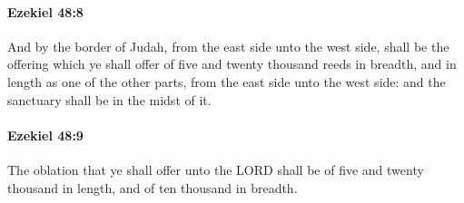 		\paragraph{Ezekiel 48:8} %
			\label{EZEKIEL-48-8}

			And by the border of Judah, from the east side unto the west side, shall be the offering which ye shall offer of five and twenty thousand reeds in breadth, and in length as one of the other parts, from the east side unto the west side: and the sanctuary shall be in the midst of it.


		\paragraph{Ezekiel 48:9} %
			\label{EZEKIEL-48-9}

			The oblation that ye shall offer unto the LORD shall be of five and twenty thousand in length, and of ten thousand in breadth.

